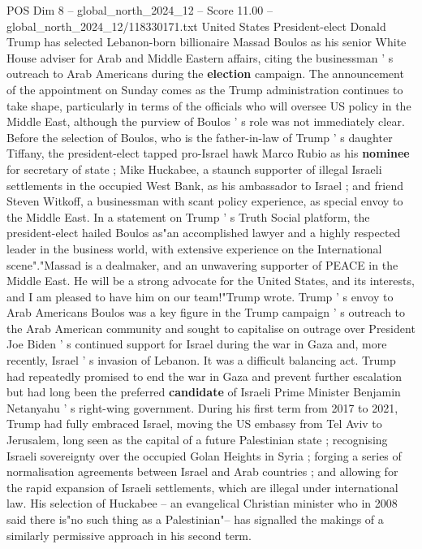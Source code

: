 \begin{textsample}{POS Dim 8 – global\_north\_2024\_12 – Score 11.00 – global\_north\_2024\_12/118330171.txt}  \label{ex:f8_pos_339}
United States President-elect Donald Trump has selected Lebanon-born billionaire Massad Boulos as his senior White House adviser for Arab and Middle Eastern affairs, citing the businessman ' s outreach to Arab Americans during the \textbf{election} campaign.
The announcement of the appointment on Sunday comes as the Trump administration continues to take shape, particularly in terms of the officials who will oversee US policy in the Middle East, although the purview of Boulos ' s role was not immediately clear.
Before the selection of Boulos, who is the father-in-law of Trump ' s daughter Tiffany, the president-elect tapped pro-Israel hawk Marco Rubio as his \textbf{nominee} for secretary of state ; Mike Huckabee, a staunch supporter of illegal Israeli settlements in the occupied West Bank, as his ambassador to Israel ; and friend Steven Witkoff, a businessman with scant policy experience, as special envoy to the Middle East.
In a statement on Trump ' s Truth Social platform, the president-elect hailed Boulos as"an accomplished lawyer and a highly respected leader in the business world, with extensive experience on the International scene"."Massad is a dealmaker, and an unwavering supporter of PEACE in the Middle East.
He will be a strong advocate for the United States, and its interests, and I am pleased to have him on our team!"Trump wrote.
Trump ' s envoy to Arab Americans Boulos was a key figure in the Trump campaign ' s outreach to the Arab American community and sought to capitalise on outrage over President Joe Biden ' s continued support for Israel during the war in Gaza and, more recently, Israel ' s invasion of Lebanon.
It was a difficult balancing act.
Trump had repeatedly promised to end the war in Gaza and prevent further escalation but had long been the preferred \textbf{candidate} of Israeli Prime Minister Benjamin Netanyahu ' s right-wing government.
During his first term from 2017 to 2021, Trump had fully embraced Israel, moving the US embassy from Tel Aviv to Jerusalem, long seen as the capital of a future Palestinian state ; recognising Israeli sovereignty over the occupied Golan Heights in Syria ; forging a series of normalisation agreements between Israel and Arab countries ; and allowing for the rapid expansion of Israeli settlements, which are illegal under international law.
His selection of Huckabee -- an evangelical Christian minister who in 2008 said there is"no such thing as a Palestinian"-- has signalled the makings of a similarly permissive approach in his second term.

\end{textsample}
